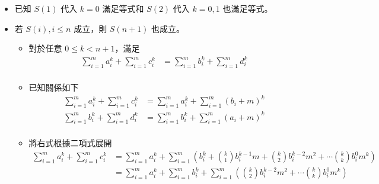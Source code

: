 \documentclass[11pt]{article}
\begin{document}
\begin{itemize}
	\item 已知 $S(1)$ 代入 $k = 0$ 滿足等式和 $S(2)$ 代入 $k = 0, 1$ 也滿足等式。
	\item 若 $S(i), i \le n$ 成立，則 $S(n+1)$ 也成立。
		\begin{itemize}
			\item 對於任意 $0 \le k < n+1$，滿足 
				\begin{equation}
				\begin{split}
					\sum_{i=1}^{m} a_i^k + \sum_{i=1}^{m} c_i^k &= 
						\sum_{i=1}^{m} b_i^k + \sum_{i=1}^{m} d_i^k \\ 
				\end{split}
				\end{equation}
			\item 已知關係如下
				\begin{equation}
				\begin{split}				
					\sum_{i=1}^{m} a_i^k + \sum_{i=1}^{m} c_i^k &=
						\sum_{i=1}^{m} a_i^k + \sum_{i=1}^{m} (b_i + m)^k \\ 
					\sum_{i=1}^{m} b_i^k + \sum_{i=1}^{m} d_i^k &=
						\sum_{i=1}^{m} b_i^k + \sum_{i=1}^{m} (a_i + m)^k \\ 
				\end{split}
				\end{equation}
			\item 將右式根據二項式展開
				\begin{equation}
				\begin{split}
					\sum_{i=1}^{m} a_i^k + \sum_{i=1}^{m} c_i^k &=
						\sum_{i=1}^{m} a_i^k + \sum_{i=1}^{m} \left (
							b_i^k + \binom{k}{1} b_i^{k-1} m + 
									\binom{k}{2} b_i^{k-2} m^2 + \cdots
									\binom{k}{k} b_i^{0} m^k
							\right ) \\
						&= \sum_{i=1}^{m} a_i^k + \sum_{i=1}^{m} b_i^k + \sum_{i=1}^{m} \left (
									\binom{k}{2} b_i^{k-2} m^2 + \cdots
									\binom{k}{k} b_i^{0} m^k
							\right )
				\end{split}
				\end{equation}
				

\end{itemize}
\end{itemize}
\end{document}
